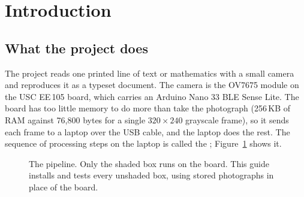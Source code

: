 \section{Introduction}
\label{sec:intro}

\subsection{What the project does}

The project reads one printed line of text or mathematics with a small camera and reproduces it
as a typeset document. The camera is the OV7675 module on the USC EE\,105 board, which carries an
Arduino Nano 33 BLE Sense Lite. The board has too little memory to do more than take the
photograph (256\,KB of RAM against 76{,}800 bytes for a single $320 \times 240$ grayscale frame),
so it sends each frame to a laptop over the USB cable, and the laptop does the rest. The sequence
of processing steps on the laptop is called the ; Figure~\ref{fig:pipeline} shows
it.

\begin{figure}[H]
\centering
{}
\caption{The pipeline. Only the shaded box runs on the board. This guide installs and tests every
unshaded box, using stored photographs in place of the board.}
\label{fig:pipeline}
\end{figure}

